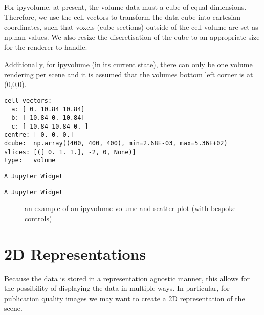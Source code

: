 \documentclass[10pt,parskip=half,
	toc=sectionentrywithdots,
	bibliography=totocnumbered,
	captions=tableheading,numbers=noendperiod]{scrartcl}
\begin{document}
For ipyvolume, at present, the volume data must a cube of equal
dimensions. Therefore, we use the cell vectors to transform the data
cube into cartesian coordinates, such that voxels (cube sections)
outside of the cell volume are set as np.nan values. We also resize the
discretisation of the cube to an appropriate size for the renderer to
handle.

Additionally, for ipyvolume (in its current state), there can only be
one volume rendering per scene and it is assumed that the volumes bottom
left corner is at (0,0,0).

\begin{lstlisting}[language={},postbreak={},numbers=none,xrightmargin=7pt,belowskip=5pt,aboveskip=5pt,breakindent=0pt]
cell_vectors: 
  a: [ 0. 10.84 10.84]
  b: [ 10.84 0. 10.84]
  c: [ 10.84 10.84 0. ]
centre: [ 0. 0. 0.]
dcube:  np.array((400, 400, 400), min=2.68E-03, max=5.36E+02)
slices: [([ 0. 1. 1.], -2, 0, None)]
type:   volume

\end{lstlisting}

\begin{lstlisting}[language={},postbreak={},numbers=none,xrightmargin=7pt,breakindent=0pt,aboveskip=5pt,belowskip=5pt]
A Jupyter Widget
\end{lstlisting}

\begin{lstlisting}[language={},postbreak={},numbers=none,xrightmargin=7pt,breakindent=0pt,aboveskip=5pt,belowskip=5pt]
A Jupyter Widget
\end{lstlisting}

\begin{figure}[H]\begin{center}\end{center}\caption{an example of an ipyvolume volume and scatter plot (with bespoke controls)}\label{fig:ipyvol3}
    \end{figure}

\section{2D Representations}\label{d-representations}

Because the data is stored in a representation agnostic manner, this
allows for the possibility of displaying the data in multiple ways. In
particular, for publication quality images we may want to create a 2D
representation of the scene.
\end{document}

